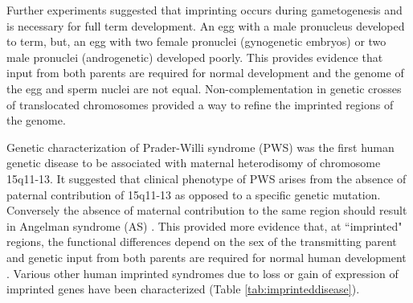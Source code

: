 Further experiments suggested that imprinting occurs during gametogenesis and is necessary for full term development. An egg with a male pronucleus developed to term, but, an egg with two female pronuclei (gynogenetic embryos) or two male pronuclei (androgenetic) developed poorly\cite{Surani1984,McGrath:1984ky}. This provides evidence that input from both parents are required for normal development and the genome of the egg and sperm nuclei are not equal. Non-complementation in genetic crosses of translocated chromosomes provided a way to refine the imprinted regions of the genome\cite{Cattanach:1985hu}. 

Genetic characterization of Prader-Willi syndrome (PWS) was the first human genetic disease to be associated with maternal heterodisomy of chromosome 15q11-13\cite{Nicholls:vh}. It suggested that clinical phenotype of PWS arises from the absence of paternal contribution of 15q11-13 as opposed to a specific genetic mutation. Conversely the absence of maternal contribution to the same region should result in Angelman syndrome (AS) \cite{Nicholls:vh,Reik:1989el}. This provided more evidence that, at ``imprinted" regions, the functional differences depend on the sex of the transmitting parent and genetic input from both parents are required for normal human development \cite{Nicholls:vh}. Various other human imprinted syndromes due to loss or gain of expression of imprinted genes have been characterized (Table \ref{tab:imprinteddisease}).

